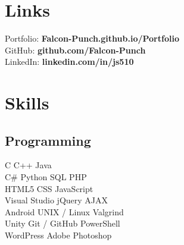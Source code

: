 \documentclass[letterpaper]{deedy-resume} %
\newcommand{\CS}{C\#}
\begin{document}
\begin{minipage}[t]{0.33\textwidth}
\sectionspace %




\section{Links} 

Portfolio: {\bf Falcon-Punch.github.io/Portfolio}\\
GitHub: {\bf github.com/Falcon-Punch}\\
LinkedIn: {\bf linkedin.com/in/js510}

\sectionspace %


\section{Skills}

\subsection{Programming}
\vspace{1.5mm}
C \textbullet{} C++ \textbullet{} Java \\
\vspace{1.5mm}
\CS{} \textbullet{} Python \textbullet{} SQL \textbullet{} PHP \\
HTML5 \textbullet{} CSS \textbullet{} JavaScript \\
\vspace{1.5mm}
Visual Studio \textbullet{} jQuery \textbullet{} AJAX \\
Android \textbullet{} UNIX / Linux \textbullet{} Valgrind \\
Unity \textbullet{} Git / GitHub \textbullet{} PowerShell \\
WordPress \textbullet{} Adobe Photoshop

\sectionspace %




\end{minipage}
\end{document}
